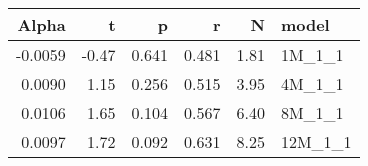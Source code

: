 \begin{table}[ht]
\centering
\begin{tabular}{rrrrrl}
  \hline
Alpha & t & p & r & N & model \\ 
  \hline
-0.0059 & -0.47 & 0.641 & 0.481 & 1.81 & 1M\_1\_1 \\ 
  0.0090 & 1.15 & 0.256 & 0.515 & 3.95 & 4M\_1\_1 \\ 
  0.0106 & 1.65 & 0.104 & 0.567 & 6.40 & 8M\_1\_1 \\ 
  0.0097 & 1.72 & 0.092 & 0.631 & 8.25 & 12M\_1\_1 \\ 
   \hline
\end{tabular}
\end{table}

